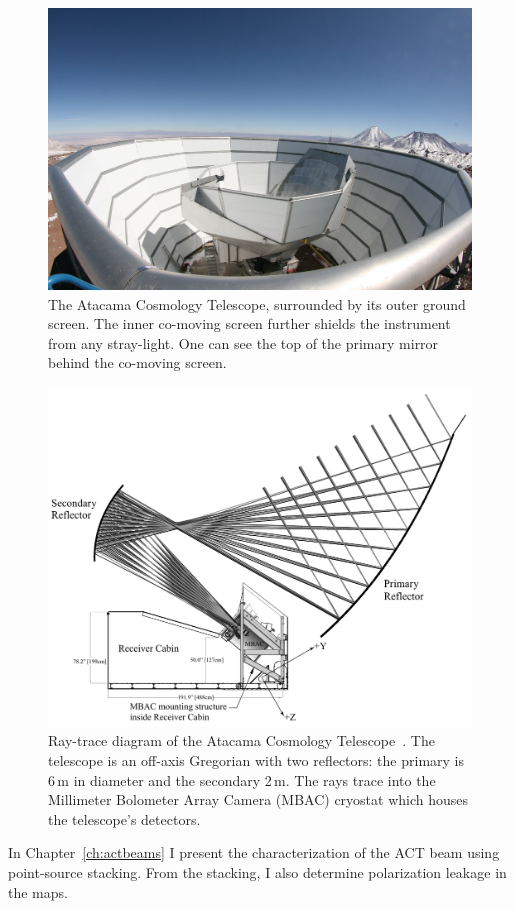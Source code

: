 \begin{figure}
    \centering
    \includegraphics[width = .7\textwidth]{Figures/act_inst_close.jpeg}
    \caption{The Atacama Cosmology Telescope, surrounded by its outer ground screen. The inner co-moving screen further shields the instrument from any stray-light.  One can see the top of the primary mirror behind the co-moving screen.}
    \label{fig:act_site}
\end{figure}

\begin{figure}[t]
    \centering
    \includegraphics[width = .8\textwidth]{Figures/act_inst.pdf}
    \caption{Ray-trace diagram of the Atacama Cosmology Telescope~\cite{act_inst}.  The telescope is an off-axis Gregorian with two reflectors: the primary is 6\,m in diameter and the secondary 2\,m.  The rays trace into the Millimeter Bolometer Array Camera (MBAC) cryostat which houses the telescope's detectors.}
    \label{fig:act_inst}
\end{figure}

In Chapter~\ref{ch:actbeams} I present the characterization of the ACT beam using point-source stacking.  From the stacking, I also determine polarization leakage in the maps.

